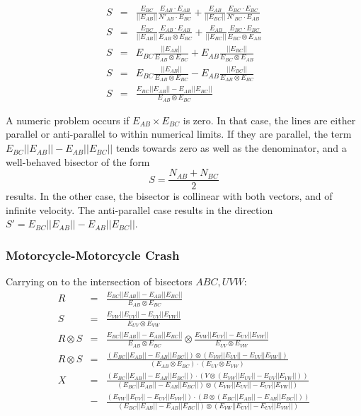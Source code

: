 \documentclass[12pt,a4paper,oneside,openany]{article}
\begin{document}
\begin{eqnarray*}
S &=& \frac{E_{BC}}{|| E_{AB} ||} \frac{E_{AB} \cdot E_{AB}}{N'_{AB} \cdot E_{BC}} +  \frac{E_{AB}}{|| E_{BC} ||} \frac{E_{BC} \cdot E_{BC}}{N'_{BC} \cdot E_{AB}} \\
S &=& \frac{E_{BC}}{|| E_{AB} ||} \frac{E_{AB} \cdot E_{AB}}{E_{AB} \otimes E_{BC}} +  \frac{E_{AB}}{|| E_{BC} ||} \frac{E_{BC} \cdot E_{BC}}{E_{BC} \otimes E_{AB}} \\
S &=& E_{BC} \frac{|| E_{AB} ||}{E_{AB} \otimes E_{BC}} +  E_{AB} \frac{|| E_{BC} ||}{E_{BC} \otimes E_{AB}} \\
S &=& E_{BC} \frac{|| E_{AB} ||}{E_{AB} \otimes E_{BC}} - E_{AB} \frac{|| E_{BC} ||}{E_{AB} \otimes E_{BC}} \\
S &=& \frac{E_{BC}|| E_{AB} || - E_{AB} || E_{BC} ||}{E_{AB} \otimes E_{BC}}
\end{eqnarray*}

A numeric problem occurs if $E_{AB} \times E_{BC}$ is zero. In that case, the lines are either parallel or anti-parallel to within numerical limits. If they are parallel, the term $E_{BC}|| E_{AB} || - E_{AB} || E_{BC} ||$ tends towards zero as well as the denominator, and a well-behaved bisector of the form
$$ S = \frac{N_{AB} + N_{BC}}{2}$$
results. In the other case, the bisector is collinear with both vectors, and of infinite velocity. The anti-parallel case results in the direction $ S' = E_{BC}|| E_{AB} || - E_{AB} || E_{BC} ||.$

\subsubsection{Motorcycle-Motorcycle Crash}

Carrying on to the intersection of bisectors $ABC, UVW$:
\begin{eqnarray*}
R &=& \frac{E_{BC} || E_{AB} || - E_{AB}|| E_{BC} ||}{E_{AB} \otimes E_{BC}} \\
S &=& \frac{E_{VW} || E_{UV} || - E_{UV}|| E_{VW} ||}{E_{UV} \otimes E_{VW}} \\
R \otimes S &=& \frac{E_{BC} || E_{AB} || - E_{AB}|| E_{BC} ||}{E_{AB} \otimes E_{BC}} \otimes \frac{E_{VW} || E_{UV} || - E_{UV}|| E_{VW} ||}{E_{UV} \otimes E_{VW}} \\
R \otimes S &=& \frac{(E_{BC} || E_{AB} || - E_{AB}|| E_{BC} ||) \otimes (E_{VW} || E_{UV} || - E_{UV}|| E_{VW} ||)}{(E_{AB} \otimes E_{BC}) \cdot (E_{UV} \otimes E_{VW})} \\
X &=& \frac{(E_{BC} || E_{AB} || - E_{AB}|| E_{BC} ||) \cdot (V \otimes (E_{VW} || E_{UV} || - E_{UV}|| E_{VW} ||)) }{(E_{BC} || E_{AB} || - E_{AB}|| E_{BC} ||) \otimes (E_{VW} || E_{UV} || - E_{UV}|| E_{VW} ||)} \\
  &-& \frac{(E_{VW} || E_{UV} || - E_{UV}|| E_{VW} ||) \cdot (B \otimes (E_{BC} || E_{AB} || - E_{AB}|| E_{BC} ||)) }{(E_{BC} || E_{AB} || - E_{AB}|| E_{BC} ||) \otimes (E_{VW} || E_{UV} || - E_{UV}|| E_{VW} ||)}
\end{eqnarray*}
\end{document}
